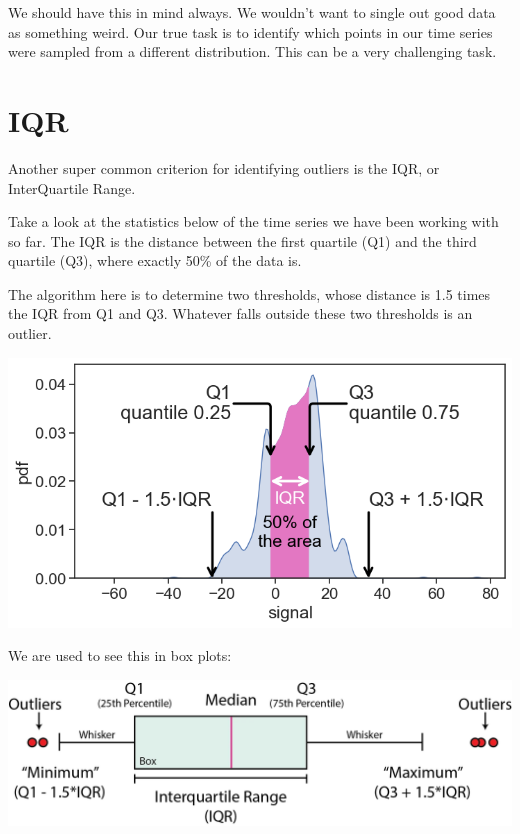 \documentclass[
  letterpaper,
  DIV=11,
  numbers=noendperiod,
  oneside]{scrreprt}
\begin{document}
We should have this in mind always. We wouldn't want to single out good
data as something weird. Our true task is to identify which points in
our time series were sampled from a different distribution. This can be
a very challenging task.

\hypertarget{iqr}{%
\section{IQR}\label{iqr}}

Another super common criterion for identifying outliers is the IQR, or
InterQuartile Range.

Take a look at the statistics below of the time series we have been
working with so far. The IQR is the distance between the first quartile
(Q1) and the third quartile (Q3), where exactly 50\% of the data is.

The algorithm here is to determine two thresholds, whose distance is 1.5
times the IQR from Q1 and Q3. Whatever falls outside these two
thresholds is an outlier.

\includegraphics{outliers/IQR_pdf.png}

We are used to see this in box plots:

\includegraphics{outliers/iqr1.png}

\end{document}
